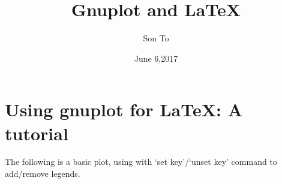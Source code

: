 \documentclass[a4paper,11pt]{article}
\title{Gnuplot and LaTeX}
\author{Son To}
\date{June 6,2017}
\begin{document}
\maketitle
\tableofcontents
\section{Using gnuplot for LaTeX: A tutorial}
The following is a basic plot, using with `set key'/`unset key'
command to add/remove legends.
  \begin{center}
    \begin{figure}
      
    \end{figure}
  \end{center}
\end{document}
